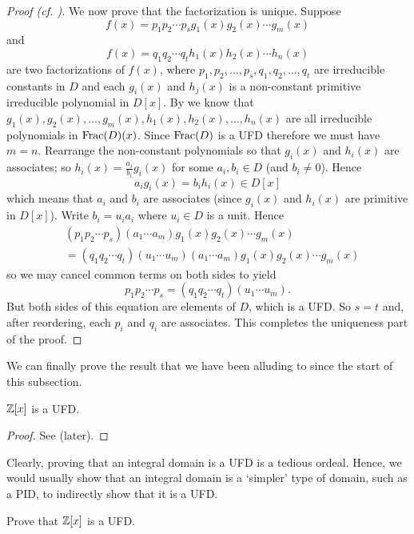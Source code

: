 \begin{proof}[Proof (cf. {\cite[Theorem 18.29]{judson_beezer_2022}})]
    We now prove that the factorization is unique. Suppose
    \[
        f(x) = p_1p_2\cdots p_s g_1(x)g_2(x) \cdots g_m(x)
    \]
    and
    \[
        f(x) = q_1q_2\cdots q_t h_1(x)h_2(x) \cdots h_n(x)
    \]
    are two factorizations of $f(x)$, where $p_1, p_2, \dots, p_s, q_1, q_2, \dots, q_t$ are irreducible constants in $D$ and each $g_i(x)$ and $h_j(x)$ is a non-constant primitive irreducible polynomial in $D[x]$. By  we know that $g_1(x), g_2(x), \dots, g_m(x), h_1(x), h_2(x), \dots, h_n(x)$ are all irreducible polynomials in $\mathrm{Frac}(D)(x)$. Since $\mathrm{Frac}(D)$ is a UFD therefore we must have $m = n$. Rearrange the non-constant polynomials so that $g_i(x)$ and $h_i(x)$ are associates; so $h_i(x) = \frac{a_i}{b_i}g_i(x)$ for some $a_i, b_i \in D$ (and $b_i \neq 0$). Hence
    \[
        a_i g_i(x) = b_i h_i(x) \in D[x]
    \]
    which means that $a_i$ and $b_i$ are associates (since $g_i(x)$ and $h_i(x)$ are primitive in $D[x]$). Write $b_i = u_ia_i$ where $u_i \in D$ is a unit. Hence
    \begin{align*}
        &(p_1p_2\cdots p_s)(a_1\cdots a_m) g_1(x)g_2(x) \cdots g_m(x)\\
        &= (q_1q_2\cdots q_t)(u_1\cdots u_m)(a_1\cdots a_m)g_1(x)g_2(x) \cdots g_m(x)
    \end{align*}
    so we may cancel common terms on both sides to yield
    \[
        p_1p_2\cdots p_s = (q_1q_2\cdots q_t)(u_1\cdots u_m).
    \]
    But both sides of this equation are elements of $D$, which is a UFD. So $s = t$ and, after reordering, each $p_i$ and $q_i$ are associates. This completes the uniqueness part of the proof.
\end{proof}

We can finally prove the result that we have been alluding to since the start of this subsection.

\begin{corollary}\label{corollary-Z-is-UFD}
    $\mathbb{Z}[x]$ is a UFD.
\end{corollary}
\begin{proof}
    See  (later).
\end{proof}

Clearly, proving that an integral domain is a UFD is a tedious ordeal. Hence, we would usually show that an integral domain is a `simpler' type of domain, such as a PID, to indirectly show that it is a UFD.

\begin{exercise}\label{exercise-Z-is-UFD}
    Prove that $\mathbb{Z}[x]$ is a UFD.
\end{exercise}

